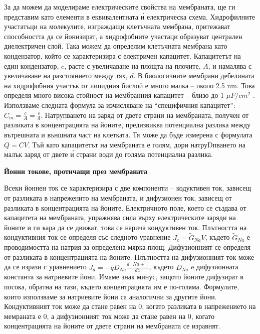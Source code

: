 \documentclass{article}
\begin{document}
За да можем да моделираме електрическите свойства на мембраната, ще ги представим като елементи в еквивалентната \'{и} електрическа схема. Хидрофилните участатъци на молекулите, изграждащи клетъчната мембрана, притежават способността да се йонизират, а хидрофобните участаци образуват централен диелектричен слой. Така можем да определим клетъчната мембрана като кондензатор, който се характеризира с електричен капацитет. Капацитетът на един кондензатор, $c$, расте с увеличаване на площта на плочите, $A$, и намалява с увеличаване на разстоянието между тях, $d$. В биологичните мембрани дебелината на хидрофобния участък от липидния бислой е много малка – около 2.5 nm. Това определя много висока стойност на мембранния капацитет – близо до 1 $\mu F/cm^2$ .  Използваме следната формула за изчисляване на “специфичния капацитет”: $C_{m}=\frac{c}{A}=\frac{\epsilon}{d}$. Натрупването на заряд от двете страни на мембраната, получен от разликата в концентрацията на йоните, предизвиква потенциална разлика между вътрешната и външната част на клетката. Тя може да бъде измерена с формулата $Q=CV$. Тъй като капацитетът на мембраната е голям, дори натруDпването на малък заряд от двете \'{и} страни води до голяма потенциална разлика. 

\vspace{5mm} %
\textbf{Йонни токове, протичащи през мембраната}

Всеки йоннен ток се характеризира с две компоненти -- кодуктивен ток, зависещ от разликата в напреженито на мембраната, и дифузионен ток, зависещ от разликата в концентрацията на йоните. Електричното поле, което се създава от капацитета на мембраната, упражнява сила върху електрическите заряди на йоните и ги кара да се движат, това се нарича кондуктивен ток. Плътността на кондуктивния ток се определя със следното уравнение $J_c=\tilde{G}_{Na}V$, където $\tilde{G}_{Na}$ е проводимостта на натрия за определена мярка площ. Дифузионният се определя от разликата в концентрацията на йоните. Плътността на дифузионният ток може да се изрази с уравнението $J_d=-qD_{Na}\frac{d[Na+]}{dx}$, където $D_{Na}$ e дифузионната константа за натриевите йони. Имаме знак минус, защото йоните дифузират в посока, обратна на тази, където концентрацията им е по-голяма. Формулите, които използваме за натриевите йони са аналогични за другите йони. Кондуктивният ток може да стане равен на 0, когато разликата в напрежението на мемраната е 0, а дифузионният ток може да стане равен на 0, когато концентрацията на йоните от двете страни на мембраната се изравнят. 
\end{document}

